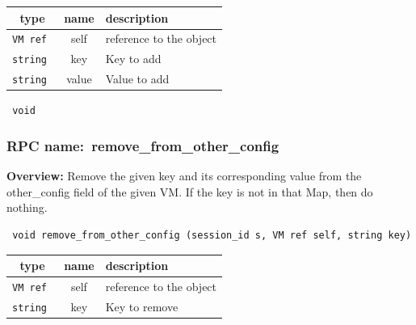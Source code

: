 
 
\vspace{0.3cm}
\begin{tabular}{|c|c|p{7cm}|}
 \hline
{\bf type} & {\bf name} & {\bf description} \\ \hline
{\tt VM ref } & self & reference to the object \\ \hline 

{\tt string } & key & Key to add \\ \hline 

{\tt string } & value & Value to add \\ \hline 

\end{tabular}

\vspace{0.3cm}

{\tt 
void
}



\vspace{0.3cm}
\vspace{0.3cm}
\vspace{0.3cm}
\subsubsection{RPC name:~remove\_from\_other\_config}

{\bf Overview:} 
Remove the given key and its corresponding value from the other\_config
field of the given VM.  If the key is not in that Map, then do nothing.

\begin{verbatim} void remove_from_other_config (session_id s, VM ref self, string key)\end{verbatim}



 
\vspace{0.3cm}
\begin{tabular}{|c|c|p{7cm}|}
 \hline
{\bf type} & {\bf name} & {\bf description} \\ \hline
{\tt VM ref } & self & reference to the object \\ \hline 

{\tt string } & key & Key to remove \\ \hline 

\end{tabular}

\vspace{0.3cm}

